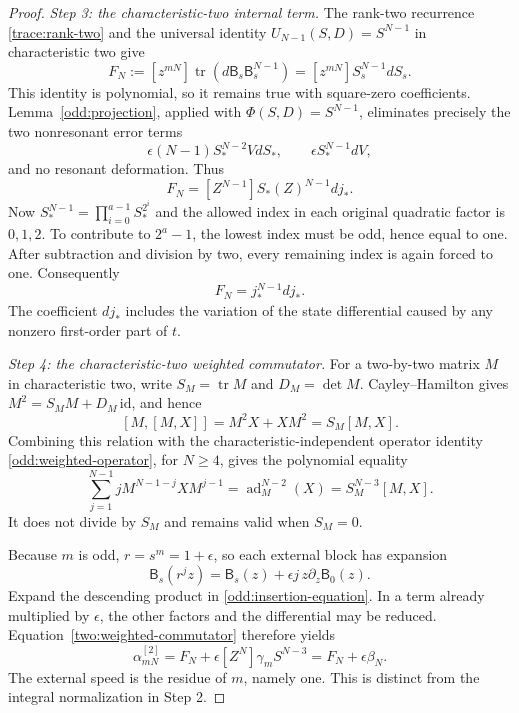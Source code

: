\begin{proof}
\emph{Step 3: the characteristic-two internal term.}
The rank-two recurrence \eqref{trace:rank-two} and the universal
identity $U_{N-1}(S,D)=S^{N-1}$ in characteristic two give
\[
 F_N:=[z^{mN}]\operatorname{tr}(d\mathsf B_s\mathsf B_s^{N-1})
     =[z^{mN}]S_s^{N-1}dS_s.
\]
This identity is polynomial, so it remains true with square-zero
coefficients. Lemma~\ref{odd:projection}, applied with
$\Phi(S,D)=S^{N-1}$, eliminates precisely the two nonresonant
error terms
\[
 \epsilon(N-1)S_*^{N-2}VdS_*,\qquad
 \epsilon S_*^{N-1}dV,
\]
and no resonant deformation. Thus
\[
 F_N=[Z^{N-1}]S_*(Z)^{N-1}dj_*.
\]
Now $S_*^{N-1}=\prod_{i=0}^{a-1}S_*^{2^i}$ and the allowed
index in each original quadratic factor is $0,1,2$. To contribute
to $2^a-1$, the lowest index must be odd, hence equal to one.
After subtraction and division by two, every remaining index
is again forced to one. Consequently
\begin{equation}
 F_N=j_*^{N-1}dj_*.
 \label{two:internal-term}
\end{equation}
The coefficient $dj_*$ includes the variation of the state
differential caused by any nonzero first-order part of $t$.

\emph{Step 4: the characteristic-two weighted commutator.}
For a two-by-two matrix $M$ in characteristic two, write
$S_M=\operatorname{tr}M$ and $D_M=\det M$. Cayley--Hamilton
gives $M^2=S_MM+D_M\,\mathrm{id}$, and hence
\[
 [M,[M,X]]=M^2X+XM^2=S_M[M,X].
\]
Combining this relation with the characteristic-independent
operator identity \eqref{odd:weighted-operator}, for $N\ge4$,
gives the polynomial equality
\begin{equation}
 \sum_{j=1}^{N-1}jM^{N-1-j}XM^{j-1}
 =\operatorname{ad}_M^{N-2}(X)=S_M^{N-3}[M,X].
 \label{two:weighted-commutator}
\end{equation}
It does not divide by $S_M$ and remains valid when $S_M=0$.

Because $m$ is odd, $r=s^m=1+\epsilon$, so each external block
has expansion
\[
 \mathsf B_s(r^jz)=\mathsf B_s(z)
                  +\epsilon j\,z\partial_z\mathsf B_0(z).
\]
Expand the descending product in
\eqref{odd:insertion-equation}. In a term already multiplied by
$\epsilon$, the other factors and the differential may be reduced.
Equation~\eqref{two:weighted-commutator} therefore yields
\begin{equation}
 \alpha_{mN}^{[2]}=F_N+\epsilon[Z^N]\gamma_m S^{N-3}
                 =F_N+\epsilon\beta_N.
 \label{two:external-term}
\end{equation}
The external speed is the residue of $m$, namely one. This is
distinct from the integral normalization in Step 2.


\end{proof}
